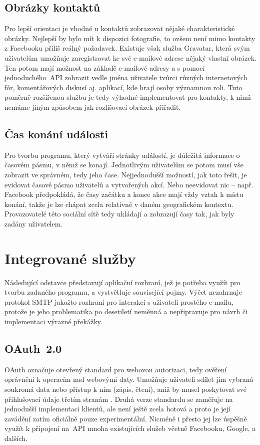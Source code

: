 \documentclass[12pt,oneside,final]{fithesis2}
\begin{document}
\subsection{Obrázky kontaktů}
Pro lepší orientaci je vhodné u kontaktů zobrazovat nějaké charakteristické obrázky. Nejlepší by bylo mít k dispozici fotografie, to ovšem není mimo kontakty z Facebooku příliš reálný požadavek. Existuje však služba Gravatar, která svým uživatelům umožňuje zaregistrovat ke své e-mailové adrese nějaký vlastní obrázek. Ten potom mají možnost na základě e-mailové adresy a s pomocí jednoduchého~API zobrazit vedle jména uživatele tvůrci různých internetových fór, komentářových diskusí aj. aplikací, kde hrají osoby významnou roli. Tuto poměrně rozšířenou službu je tedy výhodné implementovat pro kontakty, k nimž nemáme jiným způsobem jak rozlišovací obrázek přiřadit.

\subsection{Čas konání události}\label{timezone}
Pro tvorbu programu, který vytváří stránky událostí, je důležitá informace o časovém pásmu, v němž se konají. Jednotlivým uživatelům se potom musí vše zobrazit ve správném, tedy jeho čase. Nejjednodušší možností, jak toto řešit, je evidovat časové pásmo uživatelů a vytvořených akcí. Nebo neevidovat nic -- např. Facebook předpokládá, že časy začátku a konce akce mají vždy vztah k místu konání, takže je lze chápat zcela relativně v daném geografickém kontextu. Provozovatelé této sociální sítě tedy ukládají a zobrazují časy tak, jak byly zadány uživatelem.


\section{Integrované služby}
Následující odstavce představují aplikační rozhraní, jež je potřeba využít pro tvorbu zadaného programu, a vystvětluje související pojmy. Výčet nezahrnuje protokol SMTP jakožto rozhraní pro interakci s uživateli prostého e-mailu, protože je jeho problematika po desetiletí neměnná a nepřipravuje pro návrh či implementaci výrazné překážky.

\subsection{OAuth~2.0}
OAuth označuje otevřený standard pro webovou autorizaci, tedy ověření oprávnění k operacím nad webovými daty. Umožňuje uživateli sdílet jím vybraná soukromá data nebo přístup k nim (zápis, čtení), aniž by musel poskytovat své přihlašovací údaje třetím stranám \cite{maly2008oauth}. Druhá verze standardu se zaměřuje na jednodušší implementaci klientů, ale není ještě zcela hotová a proto je její zavádění zatím oficiálně pouze experimentální. Nicméně i přesto jej lze úspěšně využít k připojení na~API mnoha existujících služeb včetně Facebooku, Google, a dalších.
\end{document}
